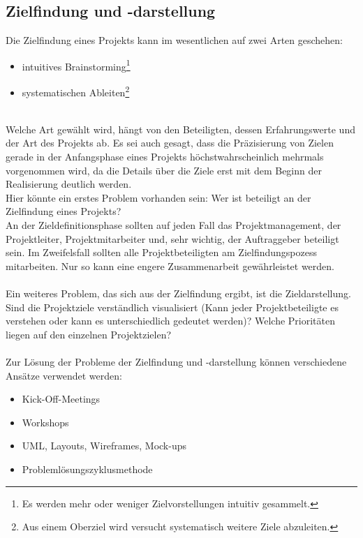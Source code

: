 \documentclass[12pt]{scrartcl}
\begin{document}
\subsection{Zielfindung und -darstellung}

Die Zielfindung eines Projekts kann im wesentlichen auf zwei Arten geschehen:
\begin{itemize}
    \item{intuitives Brainstorming\footnote{Es werden mehr oder weniger Zielvorstellungen intuitiv gesammelt.}}
    \item{systematischen Ableiten\footnote{Aus einem Oberziel wird versucht systematisch weitere Ziele abzuleiten.}}
\end{itemize}
\ \\
Welche Art gewählt wird, hängt von den Beteiligten, dessen Erfahrungswerte und der Art des Projekts ab. Es sei auch gesagt, dass die Präzisierung von Zielen gerade in der Anfangsphase eines Projekts höchstwahrscheinlich mehrmals vorgenommen wird, da die Details über die Ziele erst mit dem Beginn der Realisierung deutlich werden. \\
Hier könnte ein erstes Problem vorhanden sein: Wer ist beteiligt an der Zielfindung eines Projekts?\\ 
An der Zieldefinitionsphase sollten auf jeden Fall das Projektmanagement, der Projektleiter, Projektmitarbeiter und, sehr wichtig, der Auftraggeber beteiligt sein. Im Zweifelsfall sollten alle Projektbeteiligten am Zielfindungspozess mitarbeiten. Nur so kann eine engere Zusammenarbeit gewährleistet werden.\\
\\
Ein weiteres Problem, das sich aus der Zielfindung ergibt, ist die Zieldarstellung. Sind die Projektziele verständlich visualisiert (Kann jeder Projektbeteiligte es verstehen oder kann es unterschiedlich gedeutet werden)? Welche Prioritäten liegen auf den einzelnen Projektzielen? \\
\\
Zur Lösung der Probleme der Zielfindung und -darstellung können verschiedene Ansätze verwendet werden:
\begin{itemize}
    \item{Kick-Off-Meetings}
    
    \item{Workshops}
    
    \item{UML, Layouts, Wireframes, Mock-ups}
    
    \item{Problemlösungszyklusmethode}
    
\end{itemize}
\end{document}
